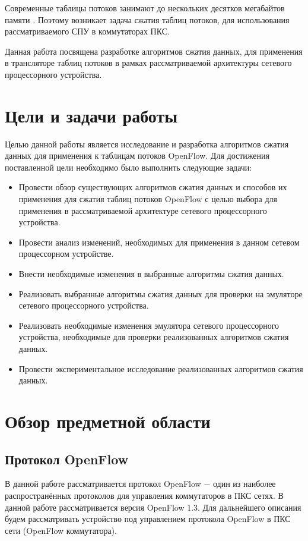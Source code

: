 \documentclass[a4paper, 12pt, titlepage, finall]{extreport}
\begin{document}
        Современные таблицы потоков занимают до нескольких десятков мегабайтов памяти \cite{rottenstreich2016optimal}. Поэтому возникает задача сжатия таблиц потоков,
        для использования рассматриваемого СПУ в коммутаторах ПКС.

        Данная работа посвящена разработке алгоритмов сжатия данных, для применения в трансляторе таблиц
        потоков в рамках рассматриваемой архитектуры сетевого процессорного устройства.

    \chapter{Цели и задачи работы}
        Целью данной работы является исследование и разработка алгоритмов сжатия данных для применения к таблицам потоков OpenFlow. Для достижения поставленной цели
        необходимо было выполнить следующие задачи:
        \begin{itemize}
            \item Провести обзор существующих алгоритмов сжатия данных и способов их применения для сжатия таблиц потоков OpenFlow с целью выбора 
                для применения в рассматриваемой архитектуре сетевого процессорного устройства.
            \item Провести анализ изменений, необходимых для применения в данном сетевом процессорном устройстве.
            \item Внести необходимые изменения в выбранные алгоритмы сжатия данных.
            \item Реализовать выбранные алгоритмы сжатия данных для проверки на эмуляторе сетевого процессорного устройства.
            \item Реализовать необходимые изменения эмулятора сетевого процессорного устройства, необходимые для проверки реализованных алгоритмов
                сжатия данных.
            \item Провести экспериментальное исследование реализованных алгоритмов сжатия данных.
        \end{itemize}
    \chapter{Обзор предметной области}
        \section{Протокол OpenFlow}
            \label{sect:openflow}
            В данной работе рассматривается протокол OpenFlow $-$ один из наиболее распространённых протоколов для управления коммутаторов в ПКС сетях.
            В данной работе рассматривается версия OpenFlow 1.3. Для дальнейшего описания будем рассматривать устройство под управлением протокола OpenFlow в ПКС сети (OpenFlow коммутатора).
\end{document}

